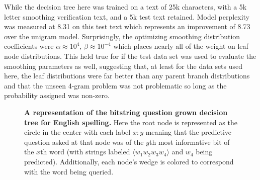 \documentclass[12pt]{article}
\begin{document}
While the decision tree here was trained on a text of 25k characters,
with a 5k letter smoothing verification text, and a 5k test text
retained. Model perplexity was measured at 8.31 on this test text
which represents an improvement of 8.73 over the unigram
model. Surprisingly, the optimizing smoothing distribution
coefficients were $\alpha \approx 10^{4}$, $\beta \approx 10^{-4}$ which places
nearly all of the weight on leaf node distributions. This held true
for if the test data set was used to evaluate the smoothing parameters
as well, suggesting that, at least for the data sets used here, the
leaf distributions were far better than any parent branch
distributions and that the unseen 4-gram problem was not problematic
so long as the probability assigned was non-zero.


\begin{figure}
  \centering
  \vspace{-1in}
  \caption{\textbf{A representation of the bitstring question grown
      decision tree for English spelling.} Here the root node is
    represented as the circle in the center with each label $x:y$
    meaning that the predictive question asked at that node was of the
    $y$th most informative bit of the $x$th word (with strings labeled
    $\langle w_1 w_2 w_3 w_4 \rangle$ and $w_4$ being
    predicted). Additionally, each node's wedge is colored to
    correspond with the word being queried.}
  \label{fig:bs_wedges}
\end{figure}
\end{document}
